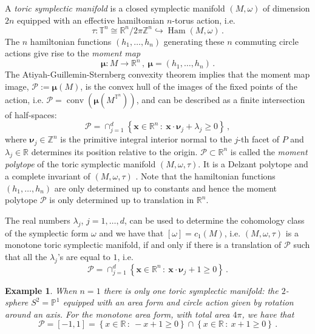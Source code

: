 \documentclass[a4paper,11pt,reqno]{amsart}
\newcommand{\R}{\mathbb R}
\newcommand{\Z}{\mathbb Z}
\newcommand{\CP}{\mathbb P}
\newcommand{\T}{\mathbb T}
\newcommand{\Pp}{{\mathcal P}}
\DeclareMathOperator{\Ham}{Ham}
\DeclareMathOperator{\conv}{conv}
\newtheorem{example}[theorem]{Example}
\begin{document}
A \emph{toric symplectic manifold} is a closed symplectic manifold $(M, \omega)$ of dimension $2n$ 
equipped with an effective hamiltomian $n$-torus action, i.e.
\[
\tau: \T^n \cong \R^{n} / 2\pi \Z^n \hookrightarrow \Ham (M, \omega)\,.
\]
The $n$ hamiltonian functions $(h_1, \ldots, h_n)$ generating these $n$ commuting circle actions
give rise to the \emph{moment map}
\[
\bm{\mu} : M \to \R^n\,,\ \bm{\mu} = (h_1, \ldots, h_n)\,.
\]
The Atiyah-Guillemin-Sternberg convexity theorem implies that the moment map image, $\Pp:= \bm{\mu} (M)$, 
is the convex hull of the images of the fixed points  of the action, i.e. $\Pp = \conv (\bm{\mu}(M^{\T^n}))$, and
can be described as a finite intersection of half-spaces:
\[
\Pp = \cap_{j=1}^d \left\{ \bm{x}\in\R^n\,:\ \bm{x}\cdot\bm{\nu}_j + \lambda_j \geq 0 \right\}\,,
\]
where $\bm{\nu}_j \in\Z^n$ is the primitive integral interior normal to the $j$-th facet of $P$ and
$\lambda_j \in \R$ determines its position relative to the origin. 
$\Pp\subset\R^n$ is called the \emph{moment polytope} of the toric symplectic manifold $(M, \omega, \tau)$.
It is a Delzant polytope and a complete invariant of $(M, \omega, \tau)$ \cite{D}. 
Note that the hamiltonian functions $(h_1, \ldots, h_n)$ are only determined up 
to constants and hence the moment polytope $\Pp$ is only determined up to translation in $\R^n$.

The real numbers $\lambda_j$, $j=1,\ldots, d$, can be used to determine the cohomology class of the 
symplectic form $\omega$ and we have that $[\omega] = c_1 (M)$, i.e.  $(M, \omega, \tau)$ is
a monotone toric symplectic manifold, if and only if there is a translation of $\Pp$ such that all the 
$\lambda_j$'s are equal to $1$, i.e.
\[
\Pp = \cap_{j=1}^d \left\{ \bm{x}\in\R^n\,:\ \bm{x}\cdot\bm{\nu}_j + 1 \geq 0 \right\}\,.
\]

\begin{example} \label{ex:2-sphere}
When $n=1$ there is only one toric symplectic manifold: the $2$-sphere $S^2 = \CP^1$ equipped with an area form
and circle action given by rotation around an axis. For the monotone area form, with total area $4\pi$, we
have that 
\[
\Pp = [-1,1] = \left\{x\in\R\,:\ -x+1\geq 0\right\} \cap  \left\{x\in\R\,:\ x+1\geq 0\right\}\,.
\]
\end{example}
\end{document}
